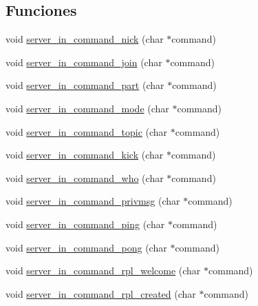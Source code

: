 \subsection*{Funciones}
\begin{DoxyCompactItemize}
\item 
void \hyperlink{G-2313-06-P2__client__function__handlers_8c_a3271de16b2f7077059343bd6f52e4866}{server\+\_\+in\+\_\+command\+\_\+nick} (char $\ast$command)
\item 
void \hyperlink{G-2313-06-P2__client__function__handlers_8c_a64c324e32edf01774722861d3abc7be3}{server\+\_\+in\+\_\+command\+\_\+join} (char $\ast$command)
\item 
void \hyperlink{G-2313-06-P2__client__function__handlers_8c_a53568ffb9d2301140815861c2f7178ad}{server\+\_\+in\+\_\+command\+\_\+part} (char $\ast$command)
\item 
void \hyperlink{G-2313-06-P2__client__function__handlers_8c_ae5f66619469f8ea0efa0a7a5d75938dc}{server\+\_\+in\+\_\+command\+\_\+mode} (char $\ast$command)
\item 
void \hyperlink{G-2313-06-P2__client__function__handlers_8c_ad908abfd32d53b9483d5afa4ca18ff14}{server\+\_\+in\+\_\+command\+\_\+topic} (char $\ast$command)
\item 
void \hyperlink{G-2313-06-P2__client__function__handlers_8c_aa3d18c616914957b9794f086466788bb}{server\+\_\+in\+\_\+command\+\_\+kick} (char $\ast$command)
\item 
void \hyperlink{G-2313-06-P2__client__function__handlers_8c_a858c0e5586286e535590f7de14620300}{server\+\_\+in\+\_\+command\+\_\+who} (char $\ast$command)
\item 
void \hyperlink{G-2313-06-P2__client__function__handlers_8c_a32594eebe5482f63993568825a9e126a}{server\+\_\+in\+\_\+command\+\_\+privmsg} (char $\ast$command)
\item 
void \hyperlink{G-2313-06-P2__client__function__handlers_8c_a09a9d4d13037bd783036a70d5a76ac46}{server\+\_\+in\+\_\+command\+\_\+ping} (char $\ast$command)
\item 
void \hyperlink{G-2313-06-P2__client__function__handlers_8c_a06042a6459e89e0ae7586e66f8595fa3}{server\+\_\+in\+\_\+command\+\_\+pong} (char $\ast$command)
\item 
void \hyperlink{G-2313-06-P2__client__function__handlers_8c_a294ef5e5070e9859d88beb603ef950f2}{server\+\_\+in\+\_\+command\+\_\+rpl\+\_\+welcome} (char $\ast$command)
\item 
void \hyperlink{G-2313-06-P2__client__function__handlers_8c_a40e46db4017fb76fc547536d9c51f5d9}{server\+\_\+in\+\_\+command\+\_\+rpl\+\_\+created} (char $\ast$command)

\end{DoxyCompactItemize}
